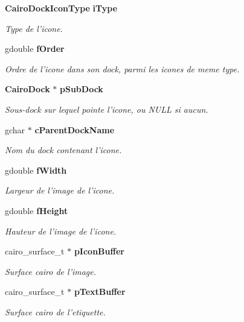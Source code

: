 \begin{CompactItemize}
{\bf CairoDockIconType} {\bf iType}
\begin{CompactList}\small\item\em Type de l'icone. \item\end{CompactList}\item 
gdouble {\bf fOrder}
\begin{CompactList}\small\item\em Ordre de l'icone dans son dock, parmi les icones de meme type. \item\end{CompactList}\item 
{\bf CairoDock} $\ast$ {\bf pSubDock}
\begin{CompactList}\small\item\em Sous-dock sur lequel pointe l'icone, ou NULL si aucun. \item\end{CompactList}\item 
gchar $\ast$ {\bf cParentDockName}
\begin{CompactList}\small\item\em Nom du dock contenant l'icone. \item\end{CompactList}\item 
gdouble {\bf fWidth}
\begin{CompactList}\small\item\em Largeur de l'image de l'icone. \item\end{CompactList}\item 
gdouble {\bf fHeight}
\begin{CompactList}\small\item\em Hauteur de l'image de l'icone. \item\end{CompactList}\item 
cairo\_\-surface\_\-t $\ast$ {\bf pIconBuffer}
\begin{CompactList}\small\item\em Surface cairo de l'image. \item\end{CompactList}\item 
cairo\_\-surface\_\-t $\ast$ {\bf pTextBuffer}
\begin{CompactList}\small\item\em Surface cairo de l'etiquette. \item\end{CompactList}\item 

\end{CompactItemize}
